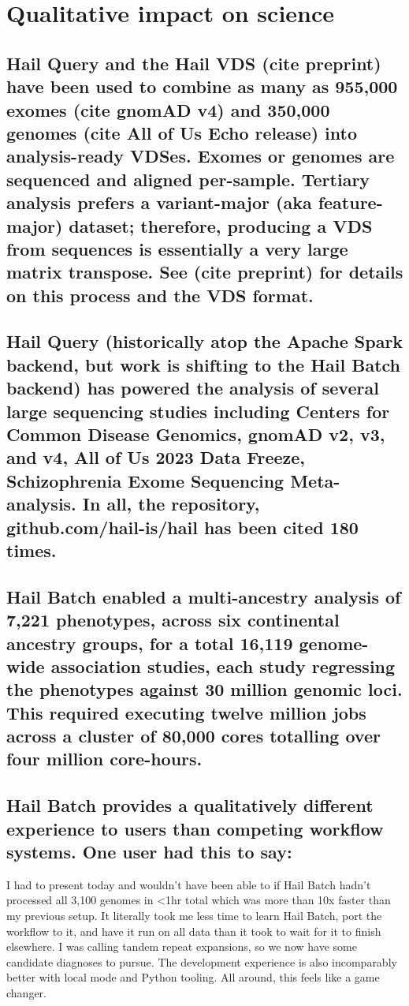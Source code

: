 \documentclass[10pt,a4paper%
]{article}
\begin{document}
\section{Qualitative impact on science}

\subsection{Hail Query and the Hail VDS (cite preprint) have been used to combine as many as 955,000 exomes (cite gnomAD v4) and 350,000 genomes (cite All of Us Echo release) into analysis-ready VDSes. Exomes or genomes are sequenced and aligned per-sample. Tertiary analysis prefers a variant-major (aka feature-major) dataset; therefore, producing a VDS from sequences is essentially a very large matrix transpose. See (cite preprint) for details on this process and the VDS format.}

\subsection{Hail Query (historically atop the Apache Spark backend, but work is shifting to the Hail Batch backend) has powered the analysis of several large sequencing studies including Centers for Common Disease Genomics, gnomAD v2, v3, and v4, All of Us 2023 Data Freeze, Schizophrenia Exome Sequencing Meta-analysis. In all, the repository, github.com/hail-is/hail has been cited 180 times.}

\subsection{Hail Batch enabled a multi-ancestry analysis of 7,221 phenotypes, across six continental ancestry groups, for a total 16,119 genome-wide association studies, each study regressing the phenotypes against 30 million genomic loci. This required executing twelve million jobs across a cluster of 80,000 cores totalling over four million core-hours.}

\subsection{Hail Batch provides a qualitatively different experience to users than competing workflow systems. One user had this to say:}

    I had to present today and wouldn't have been able to if Hail Batch hadn't processed all 3,100 genomes in <1hr total which was more than 10x faster than my previous setup. It literally took me less time to learn Hail Batch, port the workflow to it, and have it run on all data than it took to wait for it to finish elsewhere. I was calling tandem repeat expansions, so we now have some candidate diagnoses to pursue.
    The development experience is also incomparably better with local mode and Python tooling.
    All around, this feels like a game changer.
\end{document}
